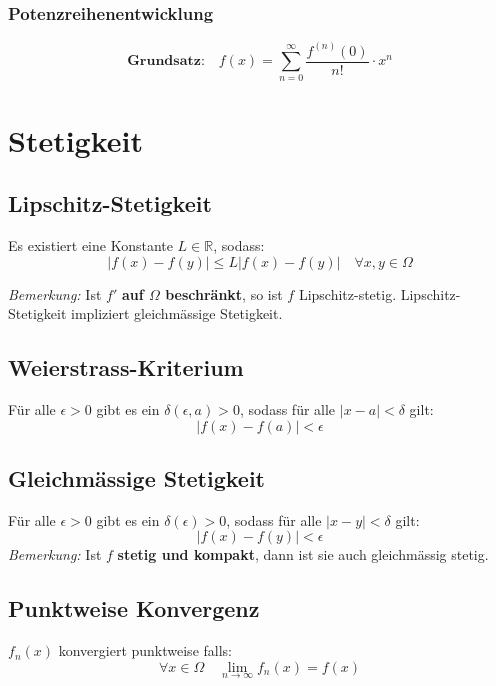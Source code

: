 \documentclass[11pt]{article}
\begin{document}
\subsubsection{Potenzreihenentwicklung}

\begin{equation*}
	\textbf{Grundsatz:} \quad f(x) = \sum_{n=0}^\infty \frac{f^{(n)}(0)}{n!} \cdot x^n
\end{equation*}

\section{Stetigkeit}

\subsection{Lipschitz-Stetigkeit}
Es existiert eine Konstante $L\in \mathbb{R}$, sodass:
\begin{equation*}
	|f(x)-f(y)|\leq L|f(x)-f(y)| \quad \forall x,y \in \Omega
\end{equation*}

\emph{Bemerkung:} Ist $f'$ \textbf{auf $\Omega$ beschr{\"a}nkt}, so ist $f$ Lipschitz-stetig. Lipschitz-Stetigkeit impliziert gleichm{\"a}ssige Stetigkeit.

\subsection{Weierstrass-Kriterium}
F{\"u}r alle $\epsilon > 0$ gibt es ein $\delta(\epsilon, a) >0$, sodass f{\"u}r alle $|x-a|<\delta$ gilt:
\begin{equation*}
	|f(x) -f(a)|<\epsilon
\end{equation*}

\subsection{Gleichm{\"a}ssige Stetigkeit}
F{\"u}r alle $\epsilon > 0$ gibt es ein $\delta(\epsilon) >0$, sodass f{\"u}r alle $|x-y|<\delta$ gilt:
\begin{equation*}
	|f(x)-f(y)| < \epsilon
\end{equation*}
\emph{Bemerkung:} Ist $f$ \textbf{stetig und kompakt}, dann ist sie auch gleichm{\"a}ssig stetig.

\subsection{Punktweise Konvergenz}
$f_n(x)$ konvergiert punktweise falls:
\begin{equation*}
	\forall x\in \Omega \quad \lim_{n\rightarrow\infty}f_n(x) = f(x)
\end{equation*}
\end{document}
